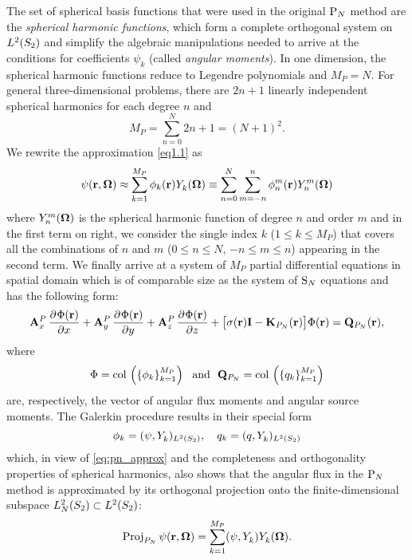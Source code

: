The set of spherical basis functions that were used in the original $\PN$ method are the
\textit{spherical harmonic functions}, which form a complete orthogonal system on $\Lp[2](\Sphere)$ and simplify
the algebraic manipulations needed to arrive at the conditions for coefficients $\psi_k$ (called \textit{angular
moments}). In one dimension, the spherical harmonic functions reduce to Legendre polynomials and $ M_P = N$. For general
three-dimensional problems, there are $2n + 1$ linearly independent spherical harmonics for each degree $n$ and
$$
	 M_P = \sum_{n=0}^{N} 2n + 1 = (N+1)^2.
$$
We rewrite the approximation \eqref{eq1.1} as
\begin{equation}\label{eq:pn_approx}
	\psi(\br,\bomega) \approx \sum_{k=1}^{ M_P} \phi_k(\br)\Y{k}{}(\bomega) \equiv
	\suma[n]{0}{N}\suma[m]{-n}{n}\angmom{n}{m}(\br)\Y{n}{m}(\bomega)
\end{equation}
where $\Y{n}{m}(\bomega)$ is the spherical harmonic function of degree $n$ and order $m$ and in the first term on right,
we consider the single index $k$ ($1 \leq k \leq  M_P$) that covers all the combinations of $n$ and $m$  
($0 \leq n \leq N$, $-n\leq m \leq n$) appearing in the second term. We finally arrive at a system of $ M_P$
partial differential equations in spatial domain which is of comparable size as the system of $\SN$ equations and has the following form:
\begin{equation}\label{eq:pn1}
	\mat{A}^P_x\,\pd{\Phi(\br)}{x} + \mat{A}_y^P\,\pd{\Phi(\br)}{y} + \mat{A}_z^P\,\pd{\Phi(\br)}{z} +
	\bigl[\sigma(\br)\mat{I} - \mat{K}_{P_N}(\br)\bigr]\Phi(\br) = \mat{Q}_{P_N}(\br),
\end{equation}
where 
\begin{equation}\label{eq:pn_vectors}
	\Phi = \col\left(\left\{\phi_k\right\}_{k=1}^{M_P}\right) \ \text{ and }\ 
	\mat{Q}_{P_N} = \col\left(\left\{q_k\right\}_{k=1}^{M_P}\right) 
\end{equation}
are, respectively, the vector of angular flux
moments and angular source moments. The Galerkin procedure results in their special form 
\begin{equation}\label{eq:pn_angmom}
	\phi_k = (\psi, \Y{k}{})_{\Lp[2](\Sphere)},\quad q_k = (q, \Y{k}{})_{\Lp[2](\Sphere)}
\end{equation}
which, in view of \eqref{eq:pn_approx} and the completeness and orthogonality properties of spherical harmonics, also 
shows that the angular flux in the $\PN$ method is approximated by its orthogonal projection onto the finite-dimensional
subspace $\Lp[2]_N(\Sphere)\subset\Lp[2](\Sphere)$:
\begin{equation}\label{eq:PN_proj}
	\Projop\psi(\br,\bomega) = \sum_{k=1}^{ M_P}(\psi, \Y{k}{}) \Y{k}{}(\bomega).
\end{equation}

